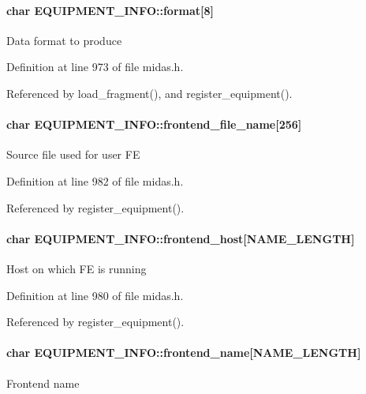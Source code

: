\paragraph[{format}]{\setlength{\rightskip}{0pt plus 5cm}char {\bf EQUIPMENT\_\-INFO::format}\mbox{[}8\mbox{]}}\hfill\label{structEQUIPMENT__INFO_a60d08f3eadb2b1f809d06d7a64b0bc5e}
Data format to produce 

Definition at line 973 of file midas.h.

Referenced by load\_\-fragment(), and register\_\-equipment().
\paragraph[{frontend\_\-file\_\-name}]{\setlength{\rightskip}{0pt plus 5cm}char {\bf EQUIPMENT\_\-INFO::frontend\_\-file\_\-name}\mbox{[}256\mbox{]}}\hfill\label{structEQUIPMENT__INFO_a0788ebd106c11c952e09f99e142d8bbf}
Source file used for user FE 

Definition at line 982 of file midas.h.

Referenced by register\_\-equipment().
\paragraph[{frontend\_\-host}]{\setlength{\rightskip}{0pt plus 5cm}char {\bf EQUIPMENT\_\-INFO::frontend\_\-host}\mbox{[}NAME\_\-LENGTH\mbox{]}}\hfill\label{structEQUIPMENT__INFO_a0f7f20fef7826740571d2ffa82da4dfd}
Host on which FE is running 

Definition at line 980 of file midas.h.

Referenced by register\_\-equipment().
\paragraph[{frontend\_\-name}]{\setlength{\rightskip}{0pt plus 5cm}char {\bf EQUIPMENT\_\-INFO::frontend\_\-name}\mbox{[}NAME\_\-LENGTH\mbox{]}}\hfill\label{structEQUIPMENT__INFO_a2cfd04e323109fe1cbb75ca8047aaa77}
Frontend name 

